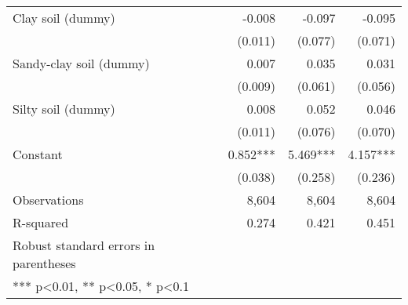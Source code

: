 \documentclass[
]{article}
\begin{document}
\begin{longtable}[t]{lrrr}
\addlinespace
Clay soil (dummy) & -0.008 & -0.097 & -0.095\\
 & (0.011) & (0.077) & (0.071)\\
Sandy-clay soil (dummy) & 0.007 & 0.035 & 0.031\\
 & (0.009) & (0.061) & (0.056)\\
Silty soil (dummy) & 0.008 & 0.052 & 0.046\\
\addlinespace
 & (0.011) & (0.076) & (0.070)\\
Constant & 0.852*** & 5.469*** & 4.157***\\
 & (0.038) & (0.258) & (0.236)\\
Observations & 8,604 & 8,604 & 8,604\\
R-squared & 0.274 & 0.421 & 0.451\\
\addlinespace
Robust standard errors in parentheses &  &  & \\
*** p<0.01, ** p<0.05, * p<0.1 &  &  & \\*
\end{longtable}
\endgroup{}
\newpage

\begingroup\fontsize{7}{9}\selectfont
\end{document}
